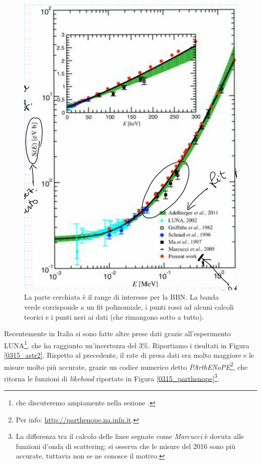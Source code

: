 \begin{figure}[h]
    \centering
    \includegraphics[scale=0.2]{Immagini/0315_fattoreastr.png}
    \caption{La parte cerchiata è il range di interesse per la BBN. La banda verde corrisponde a un fit polinomiale, i punti rossi ad alcuni calcoli teorici e i punti neri ai dati (che rimangono sotto a tutto).}
    \label{0315_astr}
\end{figure}
\newpage
\noindent Recentemente in Italia si sono fatte altre prese dati grazie all'esperimento LUNA\footnote{che discuteremo ampiamente nella sezione .}, che ha raggiunto un'incertezza del 3\%. Riportiamo i risultati in Figura \ref{0315_astr2}. Rispetto al precedente, il rate di presa dati era molto maggiore e le misure molto più accurate, grazie un codice numerico detto \textit{PArthENoPE}\footnote{Per info: \url{http://parthenope.na.infn.it}.}, che ritorna le funzioni di \textit{likehood} riportate in Figura \ref{0315_parthenope}\footnote{La differenza tra il calcolo delle linee segnate come \textit{Marcucci} è dovuta alle funzioni d'onda di scattering; si osserva che le misure del 2016 sono più accurate, tuttavia non se ne conosce il motivo.}.

